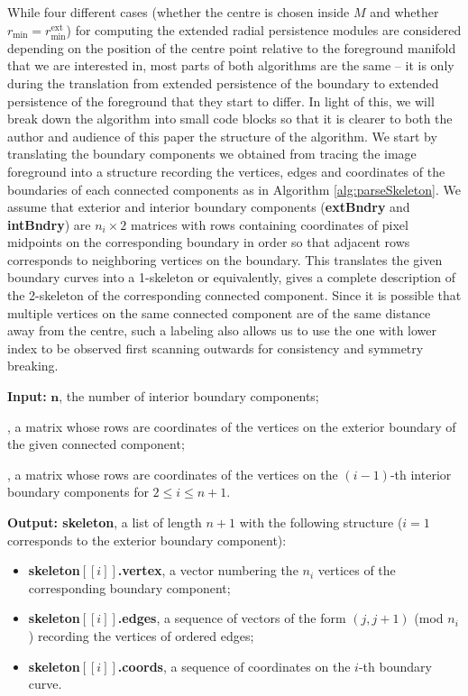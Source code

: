 \documentclass[a4paper,11pt]{article}
\theoremstyle{definition}
\begin{document}
While four different cases (whether the centre is chosen inside $M$ and whether $r_{\min}=r_{\min}^{\mathrm{ext}}$) for computing the extended radial  persistence modules are considered depending on the position of the centre point relative to the foreground manifold that we are interested in, most parts of both algorithms are the same -- it is only during the translation from extended persistence of the boundary to extended persistence of the foreground that they start to differ. In light of this, we will break down the algorithm into small code blocks so that it is clearer to both the author and audience of this paper the structure of the algorithm.
We start by translating the boundary components we obtained from tracing the image foreground into a structure recording the vertices, edges and coordinates of the boundaries of each connected components as in Algorithm \ref{alg:parseSkeleton}. We assume that exterior and interior boundary components (\textbf{extBndry} and \textbf{intBndry}) are $n_i\times 2$ matrices with rows containing coordinates of pixel midpoints on the corresponding boundary in order so that adjacent rows corresponds to neighboring vertices on the boundary. This translates the given boundary curves into a 1-skeleton or equivalently, gives a complete description of the 2-skeleton of the corresponding connected component. Since it is possible that multiple vertices on the same connected component are of the same distance away from the centre, such a labeling also allows us to use the one with lower index to be observed first scanning outwards for consistency and symmetry breaking. 

\begin{algorithm}[H]
\caption{\textbf{parseSkeleton} Translate given boundary curves into skeleton structure.}\label{alg:parseSkeleton}
\begin{algorithmic}
\State \textbf{Input:} $\boldsymbol{n}$, the number of interior boundary components;

    \;\;\;\;, a matrix whose rows are coordinates of the vertices on the  exterior boundary of the given connected component;
    
    \;\;\;\;, a matrix whose rows are coordinates of the vertices on the $(i-1)$-th interior boundary components for $2\leq i\leq n+1$.

\State \textbf{Output: {\bf skeleton}}, a list of length $n+1$ with the following structure ($i=1$ corresponds to the exterior boundary component): 
\begin{itemize}
    \item {\bf skeleton$[[i]]$.vertex}, a vector numbering the $n_i$ vertices of the corresponding boundary component;
    \item {\bf skeleton$[[i]]$.edges}, a sequence of vectors of the form $(j,j+1)$ (mod $n_i$) recording the vertices of ordered edges;
    \item {\bf skeleton$[[i]]$.coords}, a sequence of coordinates on the $i$-th boundary curve. 
\end{itemize}
 \end{algorithmic} \end{algorithm}
\end{document}
